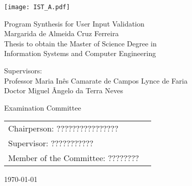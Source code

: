 \thispagestyle {empty}

\texttt{[image: IST\_A.pdf]}

\begin{center}

\vspace{2.5cm}
\vspace{1.0cm}
{\FontLb Program Synthesis for User Input Validation} \\
\vspace{2.7cm}
{\FontMb Margarida de Almeida Cruz Ferreira} \\
\vspace{2.0cm}
{\FontSn Thesis to obtain the Master of Science Degree in} \\
\vspace{0.3cm}
{\FontLb Information Systems and Computer Engineering} \\
\vspace{1.1cm}
{\FontSn %
	Supervisors:\\
	Professor Maria Inês Camarate de Campos Lynce de Faria\\
	Doctor Miguel Ângelo da Terra Neves

}
\vspace{1.1cm}

{\FontMb Examination Committee} \\

\vspace{0.5cm}

{
\FontSn %
\begin{tabular}{ll}
Chairperson: ???????????????? \\
Supervisor: ??????????? \\
Member of the Committee: ???????? \\
\end{tabular}
}

\vspace{1.5cm}

{\FontMb \monthyeardate\today}


\end{center}

\cleardoublepage

